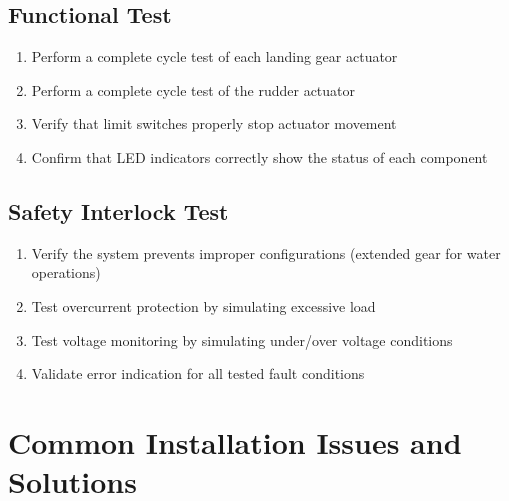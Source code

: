 \documentclass[12pt,a4paper,twoside,openright]{book}
\begin{document}
\subsection{Functional Test}
\begin{enumerate}
    \item Perform a complete cycle test of each landing gear actuator
    \item Perform a complete cycle test of the rudder actuator
    \item Verify that limit switches properly stop actuator movement
    \item Confirm that LED indicators correctly show the status of each component
\end{enumerate}

\subsection{Safety Interlock Test}
\begin{enumerate}
    \item Verify the system prevents improper configurations (extended gear for water operations)
    \item Test overcurrent protection by simulating excessive load
    \item Test voltage monitoring by simulating under/over voltage conditions
    \item Validate error indication for all tested fault conditions
\end{enumerate}

\section{Common Installation Issues and Solutions}
\end{document}
